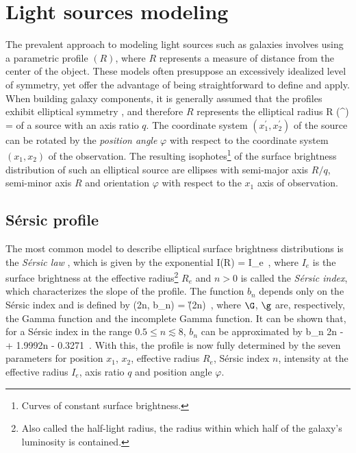 \section{Light sources modeling}
\label{sec:light_models}

The prevalent approach to modeling light sources such as galaxies involves using a parametric profile $(R)$, where $R$ represents a measure of distance from the center of the object. These models often presuppose an excessively idealized level of symmetry, yet offer the advantage of being straightforward to define and apply. When building galaxy components, it is generally assumed that the profiles exhibit elliptical symmetry \citep{peng_detailed_2002,peng_detailed_2010}, and therefore $R$ represents the elliptical radius
\be
\label{eq:4.13}
R (^\prime) = 
\ee
of a source with an axis ratio $q$. The coordinate system $({x_1^\prime} , {x_2^\prime})$ of the source can be rotated by the \emph{position angle} $\varphi$ with respect to the coordinate system $(x_1 , x_2)$ of the observation. The resulting isophotes\footnote{Curves of constant surface brightness.} of the surface brightness distribution of such an elliptical source are ellipses with semi-major axis $R/q$, semi-minor axis $R$ and orientation $\varphi$ with respect to the $x_1$ axis of observation.


\subsection{Sérsic profile}
\label{subsec:sersic}
The most common model to describe elliptical surface brightness distributions is the \emph{Sérsic law} \citep{sersic_influence_1963,sersic_atlas_1968}, which is given by the exponential
\be
\label{eq:4.14}
I(R) = I_e \exp {} \,,
\ee
where $I_e$ is the surface brightness at the effective radius\footnote{Also called the half-light radius, the radius within which half of the galaxy’s luminosity is contained.} $R_e$ and $n>0$ is called the \emph{Sérsic index}, which characterizes the slope of the profile. The function $b_n$ depends only on the Sérsic index and is defined by
\be
\label{eq:4.15}
\g (2n, b_n) =  \G(2n) \,,
\ee
where $\G$, $\g$ are, respectively, the Gamma function and the incomplete Gamma function. It can be shown \citep{ciotti_stellar_1991,ciotti_analytical_1999} that, for a Sérsic index in the range $0.5 \leq n \lesssim 8$, $b_n$ can be approximated by
\be
\label{eq:4.16}
b_n \approx 2n -  +  \approx 1.9992n - 0.3271 \,.
\ee
With this, the profile is now fully determined by the seven parameters for position $x_1$, $x_2$, effective radius $R_e$, Sérsic index $n$, intensity at the effective radius $I_e$, axis ratio $q$ and position angle $\varphi$.

